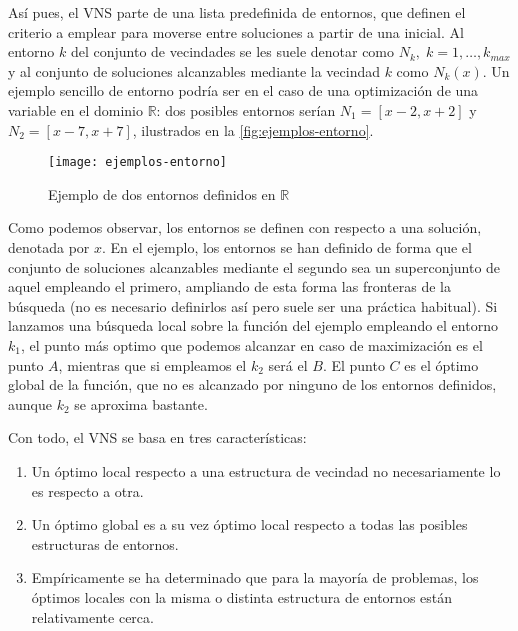 Así pues, el VNS parte de una lista predefinida de entornos, que definen el criterio a emplear para moverse entre soluciones a partir de una inicial. Al entorno $k$ del conjunto de vecindades se les suele denotar como $N_k, \; k=1,\dots,k_{max}$ y al conjunto de soluciones alcanzables mediante la vecindad $k$ como $N_k(x)$.
Un ejemplo sencillo de entorno podría ser en el caso de una optimización de una variable en el dominio $\mathbb{R}$: dos posibles entornos serían $N_1=[x-2, x+2]$ y $N_2=[x-7, x+7]$, ilustrados en la \autoref{fig:ejemplos-entorno}.

\begin{figure}[htbp]
	\centering
	\texttt{[image: ejemplos-entorno]}
	\caption{Ejemplo de dos entornos definidos en $\mathbb{R}$}
	\label{fig:ejemplos-entorno}
\end{figure}

Como podemos observar, los entornos se definen con respecto a una solución, denotada por $x$. En el ejemplo, los entornos se han definido de forma que el conjunto de soluciones alcanzables mediante el segundo sea un superconjunto de aquel empleando el primero, ampliando de esta forma las fronteras de la búsqueda (no es necesario definirlos así pero suele ser una práctica habitual). Si lanzamos una búsqueda local sobre la función del ejemplo empleando el entorno $k_1$, el punto más optimo que podemos alcanzar en caso de maximización es el punto $A$, mientras que si empleamos el $k_2$ será el $B$. El punto $C$ es el óptimo global de la función, que no es alcanzado por ninguno de los entornos definidos, aunque $k_2$ se aproxima bastante. 


Con todo, el VNS se basa en tres características:

\begin{enumerate}
	\item Un óptimo local respecto a una estructura de vecindad no necesariamente lo es respecto a otra.
	\item Un óptimo global es a su vez óptimo local respecto a todas las posibles estructuras de entornos.
	\item Empíricamente se ha determinado que para la mayoría de problemas, los óptimos locales con la misma o distinta estructura de entornos están relativamente cerca.
\end{enumerate}

